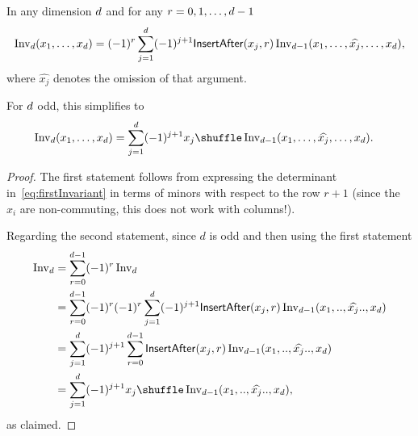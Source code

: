 \begin{lemma}
  \label{lem:dxw1}

  In any dimension $d$
  and for any $r=0,1,\dots,d-1$
  \begin{align*}
    \operatorname{Inv}_{d}(x_1,\dots,x_d)
    =
    (-1)^{r}
    \sum_{j=1}^{d}
    (-1)^{j+1} \mathsf{InsertAfter}(x_j,r) \operatorname{Inv}_{d-1}( x_1, \dots, \widehat{x_j} ,\dots, x_d ),
  \end{align*}
  where $\widehat{x_j}$ denotes the omission of that argument.

  For $d$ odd, this simplifies to
  \begin{align*}
    \firstInvariant{\ds}(x_1,\dots,x_\ds)
    &=
    \sum_{j=1}^\ds
    (-1)^{j+1}
    x_j \shuffle \firstInvariant{\ds-1}( x_1, \dots, \widehat{x_j} ,\dots, x_\ds ).
  \end{align*}
\end{lemma}

\begin{proof}
  The first statement follows from expressing the determinant in~\eqref{eq:firstInvariant}
  in terms of minors with respect to the row $r+1$
  (since the $x_i$ are non-commuting, this does not work with columns!).

  Regarding the second statement,
  since $d$ is odd and then using the first statement
  \begin{align*}
    \firstInvariant{d}
    &= \sum_{r=0}^{d-1} (-1)^r \firstInvariant{d} \\
    &= \sum_{r=0}^{d-1} (-1)^r (-1)^r \sum_{j=1}^{\ds} (-1)^{j+1} \insertAfter(x_j,r) \firstInvariant{\ds-1}( x_1, .., \widehat{x_j} .., x_\ds ) \\
    &= \sum_{j=1}^{\ds} (-1)^{j+1} \sum_{r=0}^{d-1} \insertAfter(x_j,r) \firstInvariant{\ds-1}( x_1, .., \widehat{x_j} .., x_\ds ) \\
    &= \sum_{j=1}^{\ds} (-1)^{j+1} x_j \shuffle \firstInvariant{\ds-1}( x_1, .., \widehat{x_j} .., x_\ds ),
  \end{align*}
  as claimed.
\end{proof}

